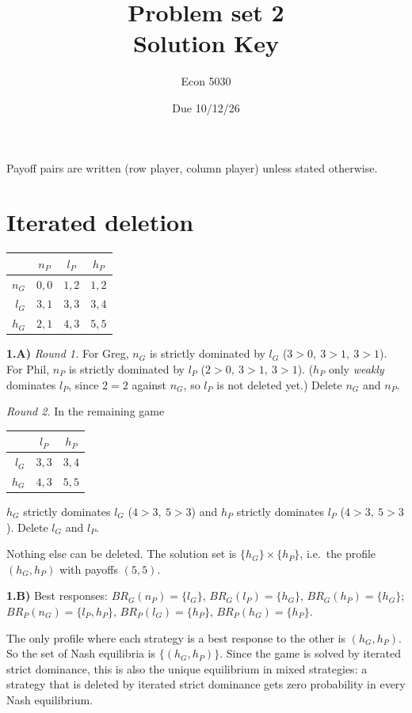 \documentclass[11pt]{article}
\title{Problem set 2 \\ \large Solution Key}
\author{Econ 5030}
\date{Due 10/12/26}
\begin{document}
\maketitle

Payoff pairs are written (row player, column player) unless stated otherwise.

\section{Iterated deletion}

\begin{center}
\begin{tabular}{r|ccc}
 & $n_P$ & $l_P$ & $h_P$ \\ \hline
$n_G$ & $0,0$ & $1,2$ & $1,2$ \\
$l_G$ & $3,1$ & $3,3$ & $3,4$ \\
$h_G$ & $2,1$ & $4,3$ & $5,5$
\end{tabular}
\end{center}

\textbf{1.A)} \emph{Round 1.} For Greg, $n_G$ is strictly dominated by $l_G$ ($3>0,\ 3>1,\ 3>1$). For Phil, $n_P$ is strictly dominated by $l_P$ ($2>0,\ 3>1,\ 3>1$). ($h_P$ only \emph{weakly} dominates $l_P$, since $2=2$ against $n_G$, so $l_P$ is not deleted yet.) Delete $n_G$ and $n_P$.

\emph{Round 2.} In the remaining game
\begin{center}
\begin{tabular}{r|cc}
 & $l_P$ & $h_P$ \\ \hline
$l_G$ & $3,3$ & $3,4$ \\
$h_G$ & $4,3$ & $5,5$
\end{tabular}
\end{center}
$h_G$ strictly dominates $l_G$ ($4>3,\ 5>3$) and $h_P$ strictly dominates $l_P$ ($4>3,\ 5>3$). Delete $l_G$ and $l_P$.

Nothing else can be deleted. The solution set is $\{h_G\}\times\{h_P\}$, i.e.\ the profile $(h_G,h_P)$ with payoffs $(5,5)$.

\textbf{1.B)} Best responses:
$BR_G(n_P)=\{l_G\}$, $BR_G(l_P)=\{h_G\}$, $BR_G(h_P)=\{h_G\}$;\quad
$BR_P(n_G)=\{l_P,h_P\}$, $BR_P(l_G)=\{h_P\}$, $BR_P(h_G)=\{h_P\}$.

The only profile where each strategy is a best response to the other is $(h_G,h_P)$. So the set of Nash equilibria is $\{(h_G,h_P)\}$. Since the game is solved by iterated strict dominance, this is also the unique equilibrium in mixed strategies: a strategy that is deleted by iterated strict dominance gets zero probability in every Nash equilibrium.
\end{document}
